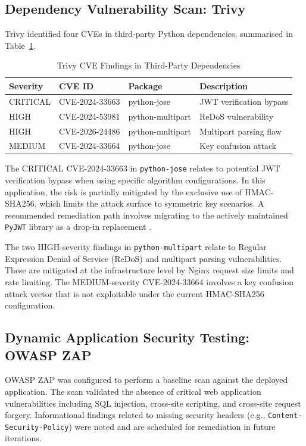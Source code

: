 \documentclass[conference]{IEEEtran}
\begin{document}
\subsection{Dependency Vulnerability Scan: Trivy}

Trivy identified four CVEs in third-party Python dependencies, summarised in Table~\ref{tab:cves}.

\begin{table}[h]
\centering
\caption{Trivy CVE Findings in Third-Party Dependencies}
\label{tab:cves}
\begin{tabular}{@{}p{1.3cm}p{2.8cm}p{1.2cm}p{2.2cm}@{}}
\toprule
\textbf{Severity} & \textbf{CVE ID} & \textbf{Package} & \textbf{Description} \\
\midrule
CRITICAL & CVE-2024-33663 & python-jose & JWT verification bypass \\
HIGH & CVE-2024-53981 & python-multipart & ReDoS vulnerability \\
HIGH & CVE-2026-24486 & python-multipart & Multipart parsing flaw \\
MEDIUM & CVE-2024-33664 & python-jose & Key confusion attack \\
\bottomrule
\end{tabular}
\end{table}

The CRITICAL CVE-2024-33663 in \texttt{python-jose} relates to potential JWT verification bypass when using specific algorithm configurations. In this application, the risk is partially mitigated by the exclusive use of HMAC-SHA256, which limits the attack surface to symmetric key scenarios. A recommended remediation path involves migrating to the actively maintained \texttt{PyJWT} library as a drop-in replacement \cite{jose2024advisory}.

The two HIGH-severity findings in \texttt{python-multipart} relate to Regular Expression Denial of Service (ReDoS) and multipart parsing vulnerabilities. These are mitigated at the infrastructure level by Nginx request size limits and rate limiting. The MEDIUM-severity CVE-2024-33664 involves a key confusion attack vector that is not exploitable under the current HMAC-SHA256 configuration.

\subsection{Dynamic Application Security Testing: OWASP ZAP}

OWASP ZAP was configured to perform a baseline scan against the deployed application. The scan validated the absence of critical web application vulnerabilities including SQL injection, cross-site scripting, and cross-site request forgery. Informational findings related to missing security headers (e.g., \texttt{Content-Security-Policy}) were noted and are scheduled for remediation in future iterations.
\end{document}
